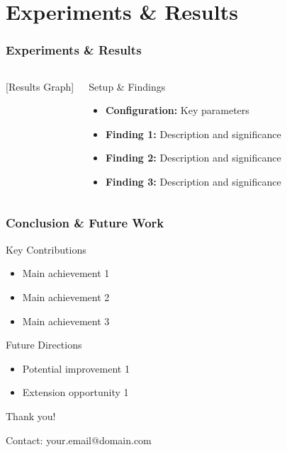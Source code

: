 \documentclass[
    9pt,
    aspectratio=169,
]{beamer}
\begin{document}
\section{Experiments \& Results}

\begin{frame}
\frametitle{Experiments \& Results}
\begin{columns}
\begin{center}
[Results Graph]
\end{center}

\begin{block}{Setup \& Findings}
    \begin{itemize}
        \item \textbf{Configuration:} Key parameters
        \item \textbf{Finding 1:} Description and significance
        \item \textbf{Finding 2:} Description and significance
        \item \textbf{Finding 3:} Description and significance
    \end{itemize}
\end{block}
\end{columns}
\end{frame}

\begin{frame}
\frametitle{Conclusion \& Future Work}
\begin{block}{Key Contributions}
    \begin{itemize}
        \item Main achievement 1
        \item Main achievement 2
        \item Main achievement 3
    \end{itemize}
\end{block}

\begin{block}{Future Directions}
    \begin{itemize}
        \item Potential improvement 1
        \item Extension opportunity 1
    \end{itemize}
\end{block}

\begin{center}
\vspace{0.5cm}
\Large Thank you!

\normalsize
Contact: your.email@domain.com
\end{center}
\end{frame}
\end{document}
